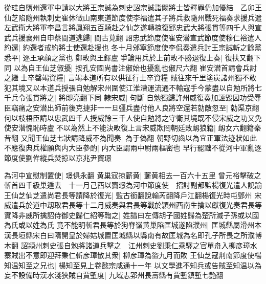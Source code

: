 從珪自鹽州還軍中請以大將王宗誠為刺史詔宗誠詣闕將士皆釋罪仍加優結　乙卯王仙芝陷隨州執刺史崔休徵山南東道節度使李福遣其子將兵救隨州戰死福奏求援兵遣左武衛大將軍李昌言將鳳翔五百騎赴之仙芝遂轉掠復郢忠武大將張貫等四千人與宣武兵援襄州自申蔡間道逃歸|{
	間古莧翻}
詔忠武節度使崔安潜宣武節度使穆仁裕遣人約還|{
	約還者戒約將士使還赴援也}
冬十月邠寧節度使李侃奏遣兵討王宗誠斬之餘黨悉平|{
	逐王承顔之黨也}
鄭畋與王鐸盧爭論用兵於上前畋不勝退復上奏|{
	復扶又翻下同}
以為自王仙芝俶擾|{
	按孔安國尚書注俶始也擾亂也俶尺六翻}
崔安潜首請會兵討之繼士卒罄竭資糧|{
	言竭本道所有以供征行士卒資糧}
賊往來千里塗炭諸州獨不敢犯其境又以本道兵授張自勉解宋州圍使江淮漕運流通不輸寇手今蒙盡以自勉所將七千兵令張貫將之|{
	將即亮翻下同}
隸宋威|{
	句斷}
自勉獨歸許州威復奏加誣毀因功受辱臣竊痛之安潜出師前後克捷非一一旦彊兵盡付他人良將空還若勍敵忽至|{
	勍渠京翻}
何以枝梧臣請以忠武四千人授威餘三千人使自勉將之守衛其境既不侵宋威之功又免使安潜愧恥時盧不以為然上不能決畋復上言宋威欺罔朝廷敗衂狼籍|{
	衂女六翻籍秦昔翻}
又聞王仙芝七狀請降威不為聞奏|{
	為于偽翻}
朝野切齒以為宜正軍法迹狀如此不應復典兵權願與内大臣參酌|{
	内大臣謂兩中尉兩樞密也}
早行罷黜不從河中軍亂逐節度使劉侔縱兵焚掠以京兆尹竇璟

為河中宣慰制置使|{
	璟俱永翻}
黄巢寇掠蘄黄|{
	蘄黄相去一百六十五里}
曾元裕擊破之斬首四千級巢遁去　十一月己酉以竇璟為河中節度使　招討副都監楊復光遣人說諭王仙芝仙芝遣尚君長等請降於復光|{
	監古銜翻說輸芮翻降戶江翻楊復光時屯鄧州}
宋威遣兵於道中刼取君長等十二月威奏與君長等戰於頴州西南生擒以獻復光奏君長等實降非威所擒詔侍御史歸仁紹等鞫之|{
	姓譜曰左傳胡子國姓歸為楚所滅子孫或以國為氏或以姓為氏}
竟不能明斬君長等於狗脊嶺黄巢陷匡城遂陷濮州|{
	匡城縣屬滑州本漢長垣縣宋白曰隋開皇於婦姑城置匡城縣以縣南有故匡城為名即孔子所畏之所濮博木翻}
詔潁州刺史張自勉將諸道兵擊之　江州刺史劉秉仁乘驛之官單舟入柳彦璋水寨賊出不意即迎拜秉仁斬彦璋散其衆|{
	柳彦璋為盜九月而敗}
王仙芝寇荆南節度使楊知温知至之兄也|{
	楊知至見上卷懿宗咸通十一年}
以文學進不知兵或告賊至知温以為妄不設備時漢水淺狹賊自賈塹度|{
	九域志郢州長壽縣有賈塹鎮塹七艶翻}


